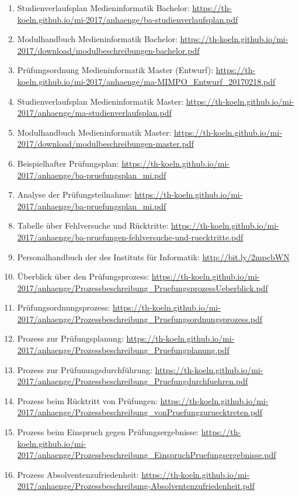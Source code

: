 \documentclass[BCOR12mm,DIV11,titlepage,a4paper,oneside,10pt]{scrbook}
\begin{document}
\begin{sloppypar}
\begin{flushleft}
\begin{enumerate}
\item{Studienverlaufsplan Medieninformatik Bachelor: \url{https://th-koeln.github.io/mi-2017/anhaenge/ba-studienverlaufsplan.pdf} } 
\item{Modulhandbuch Medieninformatik Bachelor: \url{https://th-koeln.github.io/mi-2017/download/modulbeschreibungen-bachelor.pdf} } 
\item{Prüfungsordnung Medieninformatik Master (Entwurf): \url{https://th-koeln.github.io/mi-2017/anhaenge/ma-MIMPO\_Entwurf\_20170218.pdf} } 
\item{Studienverlaufsplan Medieninformatik Master: \url{https://th-koeln.github.io/mi-2017/anhaenge/ma-studienverlaufsplan.pdf} } 
\item{Modulhandbuch Medieninformatik Master: \url{https://th-koeln.github.io/mi-2017/download/modulbeschreibungen-master.pdf} } 
\item{Beispielhafter Prüfungsplan: \url{https://th-koeln.github.io/mi-2017/anhaenge/ba-pruefungsplan\_mi.pdf} } 
\item{Analyse der Prüfungsteilnahme: \url{https://th-koeln.github.io/mi-2017/anhaenge/ba-pruefungsplan\_mi.pdf} } 
\item{Tabelle über Fehlversuche und Rücktritte: \url{https://th-koeln.github.io/mi-2017/anhaenge/ba-pruefungen-fehlversuche-und-ruecktritte.pdf} } 
\item{Personalhandbuch der des Instituts für Informatik: \url{http://bit.ly/2mpcbWN} } 
\item{Überblick über den Prüfungsprozess: \url{https://th-koeln.github.io/mi-2017/anhaenge/Prozessbeschreibung\_PruefungsprozessUeberblick.pdf} } 
\item{Prüfungsordnungsprozess: \url{https://th-koeln.github.io/mi-2017/anhaenge/Prozessbeschreibung\_Pruefungsordnungsprozess.pdf} } 
\item{Prozess zur Prüfungsplanung: \url{https://th-koeln.github.io/mi-2017/anhaenge/Prozessbeschreibung\_Pruefungplanung.pdf} } 
\item{Prozess zur Prüfunungsdurchführung: \url{https://th-koeln.github.io/mi-2017/anhaenge/Prozessbeschreibung\_Pruefungdurchfuehren.pdf} } 
\item{Prozess beim Rücktritt von Prüfungen: \url{https://th-koeln.github.io/mi-2017/anhaenge/Prozessbeschreibung\_vonPruefungzuruecktreten.pdf} } 
\item{Prozess beim Einspruch gegen Prüfungsergebnisse: \url{https://th-koeln.github.io/mi-2017/anhaenge/Prozessbeschreibung\_EinspruchPruefungsergebnisse.pdf} } 
\item{Prozess Absolventenzufriedenheit: \url{https://th-koeln.github.io/mi-2017/anhaenge/Prozessbeschreibung-Absolventenzufriedenheit.pdf} } 

\end{enumerate}
\end{flushleft}
\end{sloppypar}
\end{document}
